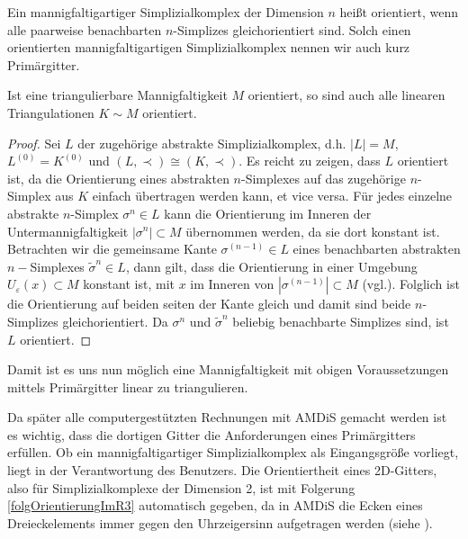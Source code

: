     \begin{definition}
      Ein mannigfaltigartiger Simplizialkomplex der Dimension \( n \) heißt orientiert, wenn alle paarweise benachbarten \( n \)-Simplizes
      gleichorientiert sind. Solch einen orientierten mannigfaltigartigen Simplizialkomplex nennen wir auch kurz Primär\-git\-ter.
    \end{definition}

    \begin{satz}
      Ist eine triangulierbare Mannigfaltigkeit \( M \) orientiert, so sind auch alle linearen Triangulationen \( K \sim M \) orientiert.
      \begin{proof}
        Sei \( L \) der zugehörige abstrakte Simplizialkomplex, d.h. \( |L|=M \), \( L^{(0)} = K^{(0)} \) und \( \left( L,\prec \right) \cong \left( K,\prec \right)\).
        Es reicht zu zeigen, dass \( L \) orientiert ist, da die Orientierung eines abstrakten \( n \)-Simplexes auf das zugehörige \( n \)-Simplex aus \( K \) einfach übertragen werden kann, et
        vice versa.
        Für jedes einzelne abstrakte \( n \)-Simplex \( \sigma^{n}\in L \) kann die Orientierung im Inneren der Untermannigfaltigkeit 
        \( |\sigma^{n}| \subset M \) übernommen werden, da sie dort
        konstant ist. 
        Betrachten wir die gemeinsame Kante \( \sigma^{(n-1)}\in L \) eines benachbarten abstrakten \( n- \)Simplexes \( \tilde{\sigma}^{n}\in L \), dann gilt, 
        dass die Orientierung in einer Umgebung \( U_{\varepsilon}(x) \subset M \) konstant ist, mit \( x \) im Inneren von \( |\sigma^{(n-1)}|\subset M \) (vgl.\cite{jaenich}).
        Folglich ist die Orientierung auf beiden seiten der Kante gleich und damit sind beide \( n \)-Simplizes gleichorientiert.
        Da \( \sigma^{n} \) und \( \tilde{\sigma}^{n} \) beliebig benachbarte Simplizes sind, ist \( L \) orientiert.
      \end{proof}
    \end{satz}

    Damit ist es uns nun möglich eine Mannigfaltigkeit mit obigen Voraussetzungen mittels Primärgitter linear zu triangulieren.

    \begin{bemerkung}
      Da später alle computergestützten Rechnungen mit AMDiS gemacht werden ist es wichtig, dass die dortigen Gitter die Anforderungen
      eines Primärgitters erfüllen. 
      Ob ein mannigfaltigartiger Simplizialkomplex als Eingangsgröße vorliegt, liegt in der Verantwortung des Benutzers.
      Die Orientiertheit eines 2D-Gitters, also für Simplizialkomplexe der Dimension 2, ist mit Folgerung \ref{folgOrientierungImR3} 
      automatisch gegeben, da in AMDiS die Ecken eines Dreieckelements immer gegen den Uhrzeigersinn aufgetragen werden
      (siehe \cite{tutorial}).
    \end{bemerkung}




